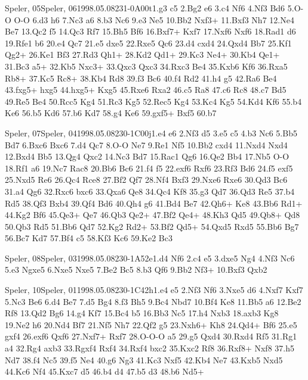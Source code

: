 \documentclass[twocolumn,a4paper,10pt]{report}
\begin{document}
\begin{chessgame}{Speler, 05}{Speler, 06}{1998.05.08}{23}{1-0}{A00t}{1.g3 c5 2.Bg2 e6 3.c4 Nf6 4.Nf3 Bd6 5.O-O O-O 6.d3 h6 7.Nc3 a6 8.b3 Nc6 9.e3 Ne5 10.Bb2 Nxf3+ 11.Bxf3 Nh7 12.Ne4 Be7 13.Qc2 f5 14.Qc3 Rf7 15.Bh5 Bf6 16.Bxf7+ Kxf7 17.Nxf6 Nxf6 18.Rad1 d6 19.Rfe1 b6 20.e4 Qc7 21.e5 dxe5 22.Rxe5 Qc6 23.d4 cxd4 24.Qxd4 Bb7 25.Kf1 Qg2+ 26.Ke1 Bf3 27.Rd3 Qh1+ 28.Kd2 Qd1+ 29.Kc3 Ne4+ 30.Kb4 Qe1+ 31.Bc3 a5+ 32.Kb5 Nxc3+ 33.Qxc3 Qxc3 34.Rxc3 Be4 35.Kxb6 Kf6 36.Rxa5 Rb8+ 37.Kc5 Rc8+ 38.Kb4 Rd8 39.f3 Bc6 40.f4 Rd2 41.h4 g5 42.Ra6 Be4 43.fxg5+ hxg5 44.hxg5+ Kxg5 45.Rxe6 Rxa2 46.c5 Ra8 47.c6 Rc8 48.c7 Bd5 49.Re5 Be4 50.Rcc5 Kg4 51.Rc3 Kg5 52.Rec5 Kg4 53.Kc4 Kg5 54.Kd4 Kf6 55.b4 Ke6 56.b5 Kd6 57.b6 Kd7 58.g4 Ke6 59.gxf5+ Bxf5 60.b7}\end{chessgame}
\begin{chessgame}{Speler, 07}{Speler, 04}{1998.05.08}{23}{0-1}{C00j}{1.e4 e6 2.Nf3 d5 3.e5 c5 4.b3 Nc6 5.Bb5 Bd7 6.Bxc6 Bxc6 7.d4 Qc7 8.O-O Ne7 9.Re1 Nf5 10.Bb2 cxd4 11.Nxd4 Nxd4 12.Bxd4 Bb5 13.Qg4 Qxc2 14.Nc3 Bd7 15.Rac1 Qg6 16.Qe2 Bb4 17.Nb5 O-O 18.Rf1 a6 19.Nc7 Rac8 20.Bb6 Bc6 21.f4 f5 22.exf6 Rxf6 23.Rf3 Bd6 24.f5 exf5 25.Nxd5 Re6 26.Qc4 Rce8 27.Bf2 Qf7 28.Nf4 Bxf3 29.Nxe6 Rxe6 30.Qd3 Bc6 31.a4 Qg6 32.Rxc6 bxc6 33.Qxa6 Qe8 34.Qc4 Kf8 35.g3 Qd7 36.Qd3 Re5 37.b4 Rd5 38.Qf3 Bxb4 39.Qf4 Bd6 40.Qh4 g6 41.Bd4 Be7 42.Qh6+ Ke8 43.Bb6 Rd1+ 44.Kg2 Bf6 45.Qe3+ Qe7 46.Qb3 Qe2+ 47.Bf2 Qe4+ 48.Kh3 Qd5 49.Qb8+ Qd8 50.Qb3 Rd5 51.Bb6 Qd7 52.Kg2 Rd2+ 53.Bf2 Qd5+ 54.Qxd5 Rxd5 55.Bb6 Bg7 56.Bc7 Kd7 57.Bf4 c5 58.Kf3 Kc6 59.Ke2 Bc3}\end{chessgame}
\begin{chessgame}{Speler, 08}{Speler, 03}{1998.05.08}{23}{0-1}{A52e}{1.d4 Nf6 2.c4 e5 3.dxe5 Ng4 4.Nf3 Nc6 5.e3 Ngxe5 6.Nxe5 Nxe5 7.Be2 Bc5 8.b3 Qf6 9.Bb2 Nf3+ 10.Bxf3 Qxb2}\end{chessgame}
\begin{chessgame}{Speler, 10}{Speler, 01}{1998.05.08}{23}{0-1}{C42h}{1.e4 e5 2.Nf3 Nf6 3.Nxe5 d6 4.Nxf7 Kxf7 5.Nc3 Be6 6.d4 Be7 7.d5 Bg4 8.f3 Bh5 9.Bc4 Nbd7 10.Bf4 Ke8 11.Bb5 a6 12.Be2 Rf8 13.Qd2 Bg6 14.g4 Kf7 15.Bc4 b5 16.Bb3 Nc5 17.h4 Nxb3 18.axb3 Kg8 19.Ne2 h6 20.Nd4 Bf7 21.Nf5 Nh7 22.Qf2 g5 23.Nxh6+ Kh8 24.Qd4+ Bf6 25.e5 gxf4 26.exf6 Qxf6 27.Nxf7+ Rxf7 28.O-O-O a5 29.g5 Qxd4 30.Rxd4 Rf5 31.Rg1 a4 32.Rg4 axb3 33.Rgxf4 Rxf4 34.Rxf4 bxc2 35.Kxc2 Rf8 36.Rxf8+ Nxf8 37.h5 Nd7 38.f4 Nc5 39.f5 Ne4 40.g6 Ng3 41.Kc3 Nxf5 42.Kb4 Ne7 43.Kxb5 Nxd5 44.Kc6 Nf4 45.Kxc7 d5 46.b4 d4 47.b5 d3 48.b6 Nd5+}\end{chessgame}
\end{document}

